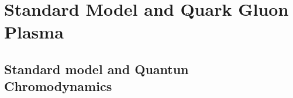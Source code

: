 \chapter{Standard Model and Quark Gluon Plasma}
\label{chap:Intro}



\section{Standard model and Quantun Chromodynamics}
